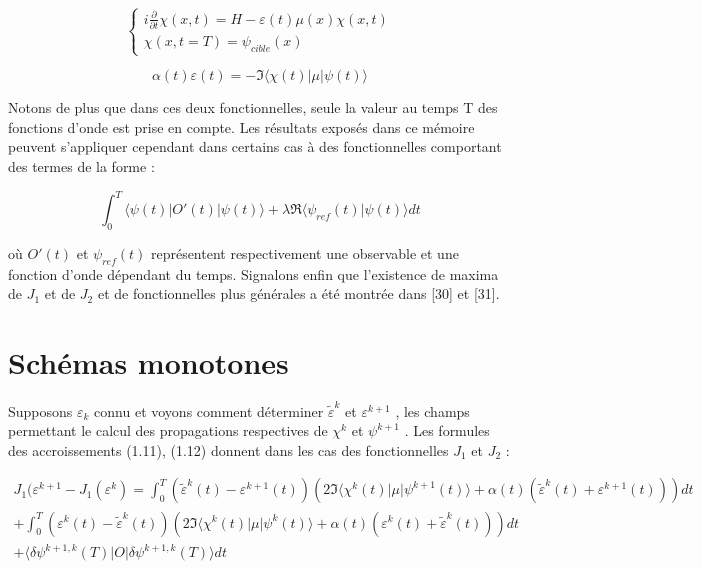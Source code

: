 \begin{equation}
\begin{cases}
i \frac{\partial}{\partial t} \chi (x,t) = H - \varepsilon(t)\mu(x)\chi(x,t)\\
\chi(x,t=T)=\psi_{cible}(x)
\end{cases}
\end{equation}

\begin{equation}
\alpha(t)\varepsilon(t) = -\Im \langle \chi(t)|\mu|\psi(t)\rangle 
\end{equation}

Notons de plus que dans ces deux fonctionnelles, seule la valeur au temps T des fonctions d’onde est prise en compte. Les résultats exposés dans ce mémoire peuvent s'appliquer cependant dans certains cas à des fonctionnelles comportant des termes de la forme :

\begin{equation}
\int_0^T \langle \psi(t)|O'(t)|\psi(t)\rangle + \lambda \Re\langle \psi_{ref}(t)|\psi(t)\rangle dt
\end{equation}

où $O'(t)$ et $\psi_{ref}(t)$ représentent respectivement une observable et une fonction d'onde dépendant du temps. Signalons enfin que l'existence de maxima de $J_1$ et de $J_2$ et de fonctionnelles plus générales a été montrée dans [30] et [31].

\section{Schémas monotones}
Supposons $\varepsilon_k$ connu et voyons comment déterminer $\tilde{\varepsilon}^k$ et $\varepsilon^{k+1}$ , les champs permettant le calcul des propagations respectives de $\chi^k$ et $\psi^{k+1}$ . Les formules des accroissements (1.11), (1.12) donnent dans les cas des fonctionnelles $J_1$ et $J_2$ :

\begin{equation}
\begin{split}
J_1(\varepsilon^{k+1} - J_1(\varepsilon^k) = \int_0^T (\tilde{\varepsilon}^k(t) - \varepsilon^{k+1}(t))(2\Im\langle \chi^k(t)|\mu|\psi^{k+1}(t)\rangle + \alpha(t)(\tilde{\varepsilon}^k(t) + \varepsilon^{k+1}(t)))dt \\
+ \int_0^T(\varepsilon^k(t) - \tilde{\varepsilon}^k(t))(2\Im\langle \chi^k(t)|\mu|\psi^k(t)\rangle + \alpha(t)(\varepsilon^k(t) + \tilde{\varepsilon}^k(t)))dt \quad\\
+ \langle \delta \psi^{k+1,k}(T)|O|\delta\psi^{k+1,k}(T)\rangle dt \phantom{111111111111111111111111111111}
\end{split}
\end{equation}

